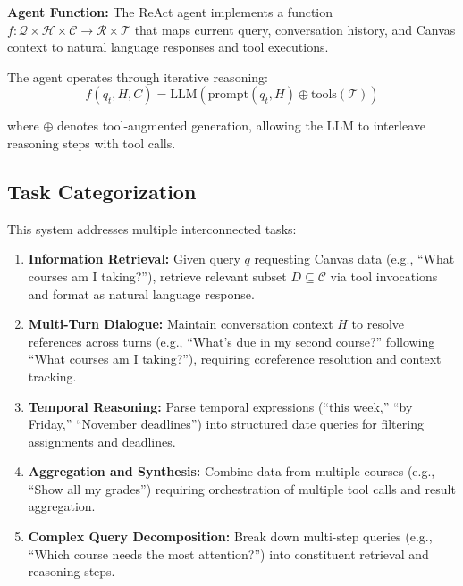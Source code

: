 \documentclass{article}
\begin{document}
\textbf{Agent Function:} The ReAct agent implements a function $f: \mathcal{Q} \times \mathcal{H} \times \mathcal{C} \rightarrow \mathcal{R} \times \mathcal{T}$ that maps current query, conversation history, and Canvas context to natural language responses and tool executions.

The agent operates through iterative reasoning:
\begin{equation}
f(q_t, H, C) = \text{LLM}(\text{prompt}(q_t, H) \oplus \text{tools}(\mathcal{T}))
\end{equation}

where $\oplus$ denotes tool-augmented generation, allowing the LLM to interleave reasoning steps with tool calls.

\subsection{Task Categorization}

This system addresses multiple interconnected tasks:

\begin{enumerate}
\item \textbf{Information Retrieval:} Given query $q$ requesting Canvas data (e.g., ``What courses am I taking?''), retrieve relevant subset $D \subseteq \mathcal{C}$ via tool invocations and format as natural language response.

\item \textbf{Multi-Turn Dialogue:} Maintain conversation context $H$ to resolve references across turns (e.g., ``What's due in my second course?'' following ``What courses am I taking?''), requiring coreference resolution and context tracking.

\item \textbf{Temporal Reasoning:} Parse temporal expressions (``this week,'' ``by Friday,'' ``November deadlines'') into structured date queries for filtering assignments and deadlines.

\item \textbf{Aggregation and Synthesis:} Combine data from multiple courses (e.g., ``Show all my grades'') requiring orchestration of multiple tool calls and result aggregation.

\item \textbf{Complex Query Decomposition:} Break down multi-step queries (e.g., ``Which course needs the most attention?'') into constituent retrieval and reasoning steps.
\end{enumerate}
\end{document}
